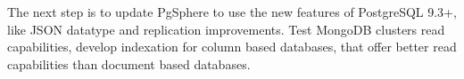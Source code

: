 \documentclass[11pt,twoside]{article}
\begin{document}
The next step is to update PgSphere to use the new features of PostgreSQL 9.3+, like JSON datatype and replication improvements.
Test MongoDB clusters read capabilities, develop indexation for column based databases, that offer better read capabilities than document based databases.



\end{document}
